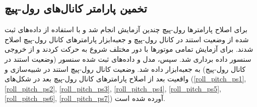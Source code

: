 \subsection{تخمین پارامتر کانال‌های رول-پیچ}
برای اصلاح پارامترها رول-پیچ چندین آزمایش انجام شد و با استفاده از داده‌های ثبت شده از وضعیت استند در کانال رول-پپچ و جعبه‌ابزار
پارامترهای کانال رول-پیچ اصلاح شدند.
برای آزمایش تمامی موتورها با دور مختلف شروع به حرکت کردند و از خروجی سنسور داده برداری شد. سپس، مدل و  داده‌های ثبت شده سنسور (وضعیت استند در کانال رول-پیج)  به جعبه‌ابزار
داده شد. وضعیت کانال رول-پیچ استند در شبیه‌سازی و واقعیت بعد از اصلاح پارامترهای کانال‌ رول-پیچ بعد در شکل‌های
(\ref{roll_pitch_ps1}, \ref{roll_pitch_ps2}, \ref{roll_pitch_ps3}, \ref{roll_pitch_ps4}, \ref{roll_pitch_ps5}, \ref{roll_pitch_ps6}, \ref{roll_pitch_ps7})
آورده شده است.


